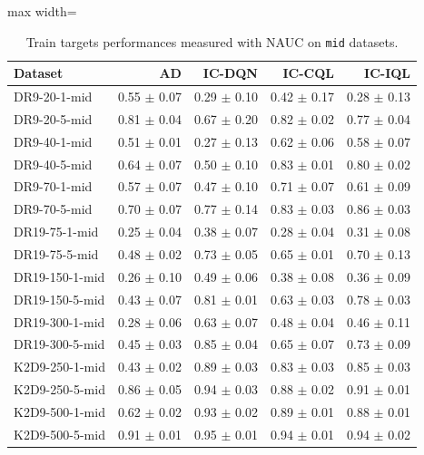 \documentclass{article}
\begin{document}
\begin{table}[ht]
    \label{tab:}
    \begin{center}
    \caption{Train targets performances measured with NAUC on \texttt{mid} datasets.}
    \begin{small}
    \begin{adjustbox}{max width=\columnwidth}
		\begin{tabular}{l|rrrr}
		\toprule
	\textbf{Dataset} & \textbf{AD} & \textbf{IC-DQN} & \textbf{IC-CQL} & \textbf{IC-IQL}\\
\midrule
DR9-20-1-mid & 0.55 $\pm$ 0.07 & 0.29 $\pm$ 0.10 & 0.42 $\pm$ 0.17 & 0.28 $\pm$ 0.13\\
DR9-20-5-mid & 0.81 $\pm$ 0.04 & 0.67 $\pm$ 0.20 & 0.82 $\pm$ 0.02 & 0.77 $\pm$ 0.04\\
DR9-40-1-mid & 0.51 $\pm$ 0.01 & 0.27 $\pm$ 0.13 & 0.62 $\pm$ 0.06 & 0.58 $\pm$ 0.07\\
DR9-40-5-mid & 0.64 $\pm$ 0.07 & 0.50 $\pm$ 0.10 & 0.83 $\pm$ 0.01 & 0.80 $\pm$ 0.02\\
DR9-70-1-mid & 0.57 $\pm$ 0.07 & 0.47 $\pm$ 0.10 & 0.71 $\pm$ 0.07 & 0.61 $\pm$ 0.09\\
DR9-70-5-mid & 0.70 $\pm$ 0.07 & 0.77 $\pm$ 0.14 & 0.83 $\pm$ 0.03 & 0.86 $\pm$ 0.03\\
DR19-75-1-mid & 0.25 $\pm$ 0.04 & 0.38 $\pm$ 0.07 & 0.28 $\pm$ 0.04 & 0.31 $\pm$ 0.08\\
DR19-75-5-mid & 0.48 $\pm$ 0.02 & 0.73 $\pm$ 0.05 & 0.65 $\pm$ 0.01 & 0.70 $\pm$ 0.13\\
DR19-150-1-mid & 0.26 $\pm$ 0.10 & 0.49 $\pm$ 0.06 & 0.38 $\pm$ 0.08 & 0.36 $\pm$ 0.09\\
DR19-150-5-mid & 0.43 $\pm$ 0.07 & 0.81 $\pm$ 0.01 & 0.63 $\pm$ 0.03 & 0.78 $\pm$ 0.03\\
DR19-300-1-mid & 0.28 $\pm$ 0.06 & 0.63 $\pm$ 0.07 & 0.48 $\pm$ 0.04 & 0.46 $\pm$ 0.11\\
DR19-300-5-mid & 0.45 $\pm$ 0.03 & 0.85 $\pm$ 0.04 & 0.65 $\pm$ 0.07 & 0.73 $\pm$ 0.09\\
K2D9-250-1-mid & 0.43 $\pm$ 0.02 & 0.89 $\pm$ 0.03 & 0.83 $\pm$ 0.03 & 0.85 $\pm$ 0.03\\
K2D9-250-5-mid & 0.86 $\pm$ 0.05 & 0.94 $\pm$ 0.03 & 0.88 $\pm$ 0.02 & 0.91 $\pm$ 0.01\\
K2D9-500-1-mid & 0.62 $\pm$ 0.02 & 0.93 $\pm$ 0.02 & 0.89 $\pm$ 0.01 & 0.88 $\pm$ 0.01\\
K2D9-500-5-mid & 0.91 $\pm$ 0.01 & 0.95 $\pm$ 0.01 & 0.94 $\pm$ 0.01 & 0.94 $\pm$ 0.02\\

\end{tabular}
\end{adjustbox}
\end{small}
\end{center}
\end{table}
\end{document}
